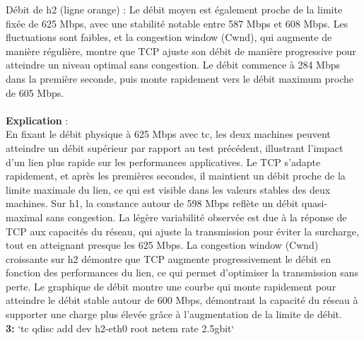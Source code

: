 Débit de h2 (ligne orange) : Le débit moyen est également proche de la limite fixée de 625 Mbps, avec une stabilité notable entre 587 Mbps et 608 Mbps. Les fluctuations sont faibles, et la congestion window (Cwnd), qui augmente de manière régulière, montre que TCP ajuste son débit de manière progressive pour atteindre un niveau optimal sans congestion. Le débit commence à 284 Mbps dans la première seconde, puis monte rapidement vers le débit maximum proche de 605 Mbps.
\\
\\
\textbf{Explication} :\\
En fixant le débit physique à 625 Mbps avec tc, les deux machines peuvent atteindre un débit supérieur par rapport au test précédent, illustrant l'impact d'un lien plus rapide sur les performances applicatives. Le TCP s’adapte rapidement, et après les premières secondes, il maintient un débit proche de la limite maximale du lien, ce qui est visible dans les valeurs stables des deux machines. Sur h1, la constance autour de 598 Mbps reflète un débit quasi-maximal sans congestion. La légère variabilité observée est due à la réponse de TCP aux capacités du réseau, qui ajuste la transmission pour éviter la surcharge, tout en atteignant presque les 625 Mbps. La congestion window (Cwnd) croissante sur h2 démontre que TCP augmente progressivement le débit en fonction des performances du lien, ce qui permet d’optimiser la transmission sans perte. Le graphique de débit montre une courbe qui monte rapidement pour atteindre le débit stable autour de 600 Mbps, démontrant la capacité du réseau à supporter une charge plus élevée grâce à l’augmentation de la limite de débit.
\vspace{1cm}
\\
\textbf{3:} `tc qdisc add dev h2-eth0 root netem rate 2.5gbit`
